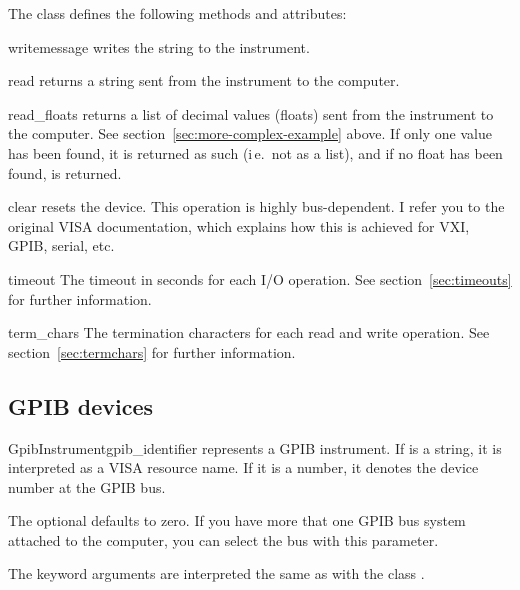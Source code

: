 \documentclass{howto}
\begin{document}
The class  defines the following methods and attributes:

\begin{methoddesc}{write}{message}
  writes the string  to the instrument.
\end{methoddesc}

\begin{methoddesc}{read}{}
  returns a string sent from the instrument to the computer.
\end{methoddesc}

\begin{methoddesc}{read_floats}{}
  returns a list of decimal values (floats) sent from the instrument to the
  computer.  See section~\ref{sec:more-complex-example} above.  If only one
  value has been found, it is returned as such (i\,e.\ not as a list), and if
  no float has been found,  is returned.
\end{methoddesc}

\begin{methoddesc}{clear}{}
  resets the device.  This operation is highly bus-dependent.  I refer you to
  the original VISA documentation, which explains how this is achieved for VXI,
  GPIB, serial, etc.
\end{methoddesc}

\begin{memberdesc}{timeout}
  The timeout in seconds for each I/O operation.  See
  section~\ref{sec:timeouts} for further information.
\end{memberdesc}

\begin{memberdesc}{term_chars}
  The termination characters for each read and write operation.  See
  section~\ref{sec:termchars} for further information.
\end{memberdesc}


\subsection{GPIB devices}
\label{sec:gpib-devices}

\begin{classdesc}{GpibInstrument}{gpib_identifier}
  represents a GPIB instrument.  If  is a string, it is
  interpreted as a VISA resource name.  If it is a number, it denotes the
  device number at the GPIB bus.

  The optional  defaults to zero.  If you have more that one
  GPIB bus system attached to the computer, you can select the bus with this
  parameter.

  The keyword arguments are interpreted the same as with the class
  .
\end{classdesc}
\end{document}
